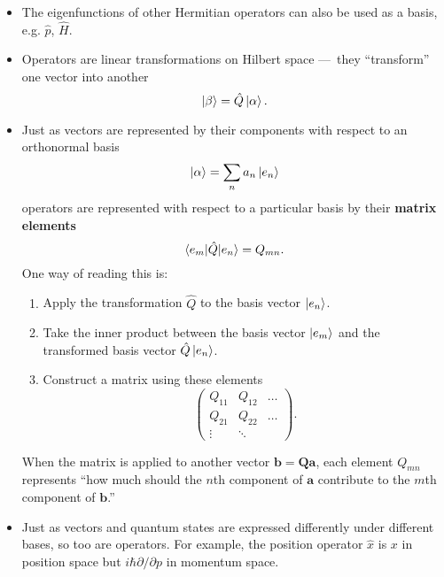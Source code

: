 \documentclass{article}
\renewcommand{\vec}[1]{\boldsymbol{\mathbf{#1}}}
\begin{document}
\begin{itemize}
  \item The eigenfunctions of other Hermitian operators can also be used as a basis, e.g. $\hat{p}$, $\hat{H}$.

  \item Operators are linear transformations on Hilbert space — they ``transform'' one vector into another \[\ket{\beta} = \hat{Q} \ket{\alpha}.\]

  \item Just as vectors are represented by their components with respect to an orthonormal basis \[\ket{\alpha} = \sum_n a_n \ket{e_n}\] operators are represented with respect to a particular basis by their \textbf{matrix elements} \[\braket{e_m | \hat{Q} | e_n} = Q_{m n}.\] One way of reading this is:

        \begin{enumerate}
          \item Apply the transformation $\hat{Q}$ to the basis vector $\ket{e_n}$.

          \item Take the inner product between the basis vector $\ket{e_m}$ and the transformed basis vector $\hat{Q} \ket{e_n}$.

          \item Construct a matrix using these elements \[\begin{pmatrix}
                    Q_{1 1} & Q_{1 2} & \ldots \\
                    Q_{2 1} & Q_{2 2} & \ldots \\
                    \vdots  & \ddots
                  \end{pmatrix}.\]
        \end{enumerate}

        When the matrix is applied to another vector $\vec{b} = \vec{Q} \vec{a}$, each element $Q_{m n}$ represents ``how much should the $n$th component of $\vec{a}$ contribute to the $m$th component of $\vec{b}$.''

  \item Just as vectors and quantum states are expressed differently under different bases, so too are operators. For example, the position operator $\hat{x}$ is $x$ in position space but $i \hbar \partial / \partial p$ in momentum space.
\end{itemize}
\end{document}
